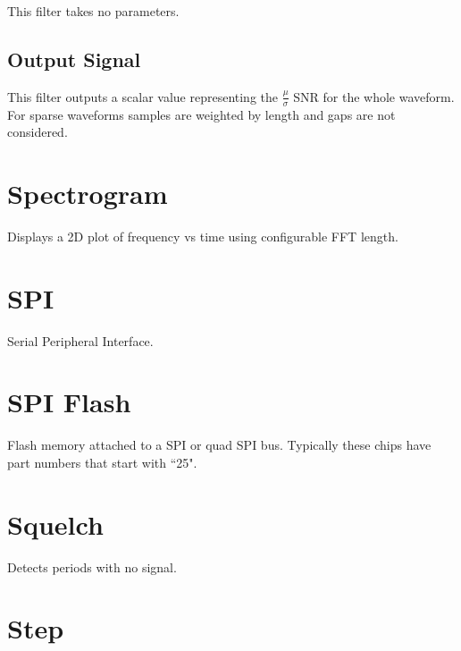 This filter takes no parameters.

\subsection{Output Signal}

This filter outputs a scalar value representing the $\frac{\mu}{\sigma}$ SNR for the whole waveform. For sparse
waveforms samples are weighted by length and gaps are not considered.

\pagebreak
\section{Spectrogram}

Displays a 2D plot of frequency vs time using configurable FFT length.

\pagebreak
\section{SPI}

Serial Peripheral Interface.

\pagebreak
\section{SPI Flash}

Flash memory attached to a SPI or quad SPI bus. Typically these chips have part numbers that start with ``25".

\pagebreak
\section{Squelch}

Detects periods with no signal.

\pagebreak
\section{Step}

